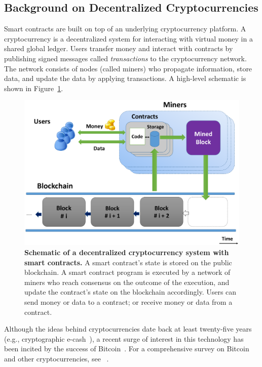 \documentclass[10pt,twocolumn,letterpaper]{article}
\begin{document}
\subsection{Background on Decentralized Cryptocurrencies}
Smart contracts are built on top of an underlying cryptocurrency platform. A cryptocurrency is a decentralized system for interacting with virtual money in a shared global ledger. Users transfer money and interact with contracts by publishing signed messages called \emph{transactions} to the cryptocurrency network. The network consists of nodes (called miners) who propagate information, store data, and update the data by applying transactions. A high-level schematic is shown in Figure~\ref{fig:schematic}.
\begin{figure}[t]
\centering
\includegraphics[width=\columnwidth]{overview_figure}
\caption{{\bf Schematic of a decentralized cryptocurrency system 
with smart contracts.}
A smart contract's state is stored on the public blockchain.
A smart contract program is executed by a 
network of miners who reach consensus on the
outcome of the execution, and update the contract's state 
on the blockchain accordingly.
Users can send money or data to a contract;
or receive money or data from a contract.
}
\label{fig:schematic}
\end{figure}

Although the ideas behind cryptocurrencies date back at least twenty-five years (e.g., cryptographic e-cash~\cite{chaum-ecash}), a recent surge of interest in this technology has been incited by the success of Bitcoin~\cite{bitcoin}. For a comprehensive survey on Bitcoin and other cryptocurrencies, see ~\cite{researchperspectives,bittertobetter}.
\end{document}
